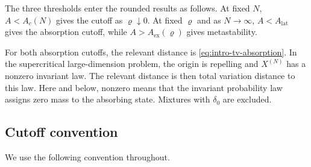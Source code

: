 \documentclass[11pt,reqno,a4paper]{article}
\begin{document}
The three thresholds enter the rounded results as follows. At fixed $N$,
$A<A_c(N)$ gives the cutoff as $\varrho\downarrow0$. At fixed $\varrho$ and
as $N\to\infty$, $A<A_{\mathrm{lat}}$ gives the absorption cutoff, while
$A>A_{\mathrm{ex}}(\varrho)$ gives metastability.

For both absorption cutoffs, the relevant distance is
\cref{eq:intro-tv-absorption}.
In the supercritical large-dimension problem, the origin is repelling and
$X^{(N)}$ has a nonzero invariant law. The relevant distance is
then total variation distance to this law.
Here and below, nonzero means that the invariant probability law assigns zero
mass to the absorbing state. Mixtures with $\delta_0$ are excluded.

\subsection{Cutoff convention}
\label{subsec:intro-cutoff-convention}

We use the following convention throughout.
\end{document}
